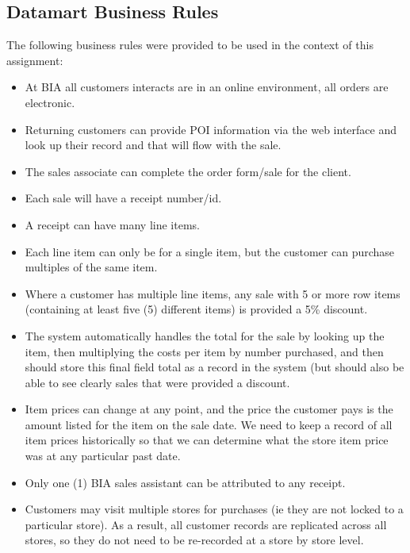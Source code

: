 \documentclass{article}
\begin{document}
    \subsection{Datamart Business Rules}
    The following business rules were provided to be used in the context of this assignment:
    \begin{itemize}
        
        \item At BIA all customers interacts are in an online environment, all orders are electronic.
        \item Returning customers can provide POI information via the web interface and look up their
        record and that will flow with the sale.
        \item The sales associate can complete the order form/sale for the client.
        \item Each sale will have a receipt number/id.
        \item A receipt can have many line items.
        \item Each line item can only be for a single item, but the customer can purchase multiples 
        of the same item.
        \item Where a customer has multiple line items, any sale with 5 or more row items 
        (containing at least five (5) different items) is provided a 5\% discount.
        \item The system automatically handles the total for the sale by looking up the item, then 
        multiplying the costs per item by number purchased, and then should store this final field 
        total as a record in the system (but should also be able to see clearly sales that were 
        provided a discount. 
        \item Item prices can change at any point, and the price the customer
        pays is the amount listed for the item on the sale date. We need to
        keep a record of all item prices historically so that we can determine what the store item 
        price was at any particular past date.
        \item Only one (1) BIA sales assistant can be attributed to any receipt.
        \item Customers may visit multiple stores for purchases (ie they are not locked to a particular 
        store). As a result, all customer records are replicated across all stores, so they do not need 
        to be re-recorded at a store by store level.
    \end{itemize}
   
\end{document}
